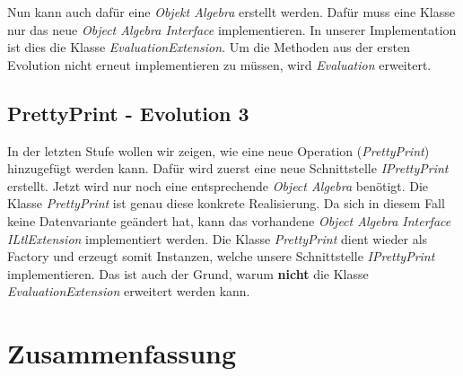 \documentclass{llncs}
\begin{document}
Nun kann auch dafür eine \emph{Objekt Algebra} erstellt werden.
Dafür muss eine Klasse nur das neue \emph{Object Algebra Interface} implementieren. In unserer Implementation ist dies die Klasse \emph{EvaluationExtension}.
Um die Methoden aus der ersten Evolution nicht erneut implementieren zu müssen, wird \emph{Evaluation} erweitert.

\subsection{PrettyPrint - Evolution 3}
In der letzten Stufe wollen wir zeigen, wie eine neue Operation (\emph{PrettyPrint}) hinzugefügt werden kann. Dafür wird zuerst eine neue Schnittstelle \emph{IPrettyPrint} erstellt.
Jetzt wird nur noch eine entsprechende \emph{Object Algebra} benötigt. Die Klasse \emph{PrettyPrint} ist genau diese konkrete Realisierung.
Da sich in diesem Fall keine Datenvariante geändert hat, kann das vorhandene \emph{Object Algebra Interface} \emph{ILtlExtension} implementiert werden.
Die Klasse \emph{PrettyPrint} dient wieder als Factory und erzeugt somit Instanzen, welche unsere Schnittstelle \emph{IPrettyPrint} implementieren.
Das ist auch der Grund, warum \textbf{nicht} die Klasse \emph{EvaluationExtension} erweitert werden kann.

\section{Zusammenfassung} \label{sec:conclusion}
\end{document}
